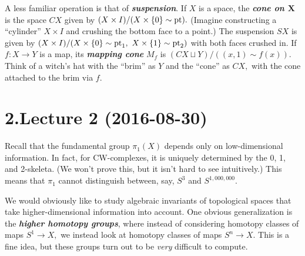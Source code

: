 \documentclass{article}
\begin{document}
A less familiar operation is that of \textbf{\emph{suspension}}. If $X$ is a space, the \textbf{\emph{cone on $\bm{X}$}} is the space $CX$ given by $(X \times I) / (X \times \{0\} \sim \operatorname{pt}).$ (Imagine constructing a \textquotedblleft{}cylinder\textquotedblright{} $X \times I$ and crushing the bottom face to a point.) The suspension $SX$ is given by $(X \times I) / (X \times \{0\} \sim \operatorname{pt}_1,\ X \times \{1\} \sim \operatorname{pt}_2)$ with both faces crushed in. If $f: X \to Y$ is a map, its \textbf{\emph{mapping cone}} $M_f$ is $(CX \sqcup Y) / ((x,1) \sim f(x)).$ Think of a witch's hat with the \textquotedblleft{}brim\textquotedblright{} as $Y$ and the \textquotedblleft{}cone\textquotedblright{} as $CX,$ with the cone attached to the brim via $f.$%

\section{2.\hspace*{0.5em}Lecture 2 (2016-08-30)}\label{sec-lecture-2-2016-08-30}%

\noindent{}Recall that the fundamental group $\pi_1(X)$ depends only on low-dimensional information. In fact, for CW-complexes, it is uniquely determined by the 0, 1, and 2-skeleta. (We won't prove this, but it isn't hard to see intuitively.) This means that $\pi_1$ cannot distinguish between, say, $S^3$ and $S^{1,000,000}.$%

We would obviously like to study algebraic invariants of topological spaces that take higher-dimensional information into account. One obvious generalization is the \textbf{\emph{higher homotopy groups}}, where instead of considering homotopy classes of maps $S^1 \to X,$ we instead look at homotopy classes of maps $S^n \to X.$ This is a fine idea, but these groups turn out to be \emph{very} difficult to compute.%
\end{document}
